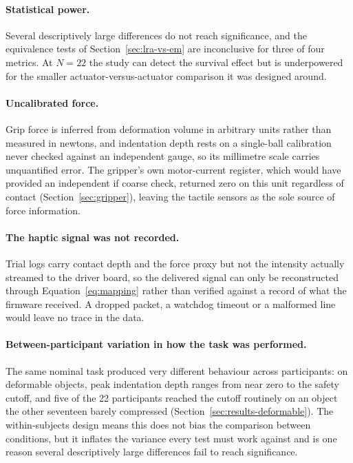 \documentclass[12pt, a4paper, twoside, openright]{report}
\begin{document}
\paragraph{Statistical power.} Several descriptively large differences do not
reach significance, and the equivalence tests of
Section~\ref{sec:lra-vs-em} are inconclusive for three of four metrics. At
$N=22$ the study can detect the survival effect but is underpowered for the
smaller actuator-versus-actuator comparison it was designed around.

\paragraph{Uncalibrated force.} Grip force is inferred from deformation volume
in arbitrary units rather than measured in newtons, and indentation depth rests
on a single-ball calibration never checked against an independent gauge, so its
millimetre scale carries unquantified error. The gripper's own motor-current
register, which would have provided an independent if coarse check, returned
zero on this unit regardless of contact (Section~\ref{sec:gripper}), leaving
the tactile sensors as the sole source of force information.

\paragraph{The haptic signal was not recorded.} Trial logs carry contact depth
and the force proxy but not the intensity actually streamed to the driver
board, so the delivered signal can only be reconstructed through
Equation~\eqref{eq:mapping} rather than verified against a record of what the
firmware received. A dropped packet, a watchdog timeout or a malformed line
would leave no trace in the data.

\paragraph{Between-participant variation in how the task was performed.} The
same nominal task produced very different behaviour across participants: on
deformable objects, peak indentation depth ranges from near zero to the safety
cutoff, and five of the 22 participants reached the cutoff routinely on an
object the other seventeen barely compressed (Section~\ref{sec:results-deformable}).
The within-subjects design means this does not bias the comparison between
conditions, but it inflates the variance every test must work against and is
one reason several descriptively large differences fail to reach significance.
\end{document}
